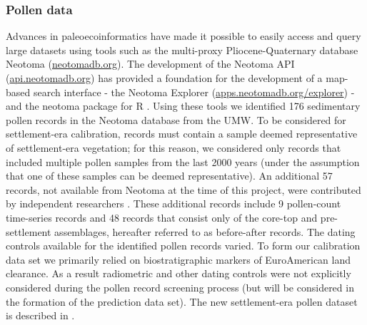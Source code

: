 \documentclass[12pt]{article}
\begin{document}


\subsubsection{Pollen data}

Advances in paleoecoinformatics \citep{brewer2012paleoecoinformatics,
  grimm2013encyclopedia} have made it possible to easily access and
query large datasets using tools such as the multi-proxy
Pliocene-Quaternary database Neotoma (\url{neotomadb.org}). The
development of the Neotoma API (\url{api.neotomadb.org}) has provided
a foundation for the development of a map-based search interface - the
Neotoma Explorer (\url{apps.neotomadb.org/explorer}) - and the neotoma
package for R \citep{goring2015}. Using these tools we identified 176
sedimentary pollen records in the Neotoma database from the UMW. To be
considered for settlement-era calibration, records must contain a
sample deemed representative of settlement-era vegetation; for this
reason, we considered only records that included multiple pollen
samples from the last 2000 years (under the assumption that one of
these samples can be deemed representative). An additional 57 records,
not available from Neotoma at the time of this project, were
contributed by independent researchers \citep{kujawa2016}. These
additional records include 9 pollen-count time-series records and 48
records that consist only of the core-top and pre-settlement
assemblages, hereafter referred to as before-after records. The dating
controls available for the identified pollen records varied. To form
our calibration data set we primarily relied on biostratigraphic
markers of EuroAmerican land clearance.  As a result radiometric and
other dating controls were not explicitly considered during the pollen
record screening process (but will be considered in the formation of
the prediction data set). The new settlement-era pollen dataset is
described in \citet{kujawa2016}.
\end{document}

